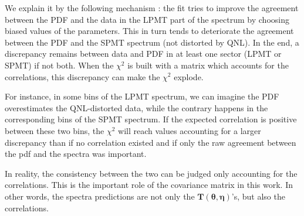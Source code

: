 \documentclass[../main.tex]{subfiles}
\begin{document}
We explain it by the following mechanism : the fit tries to improve the agreement between the PDF and the data in the LPMT part of the spectrum by choosing biased values of the parameters. This in turn tends to deteriorate the agreement between the PDF and the SPMT spectrum (not distorted by QNL). In the end, a discrepancy remains between data and PDF in at least one sector (LPMT or SPMT) if not both. When the $\chi^2$ is built with a matrix which accounts for the correlations, this discrepancy can make the $\chi^2$ explode.

For instance, in some bins of the LPMT spectrum, we can imagine the PDF overestimates the QNL-distorted data, while the contrary happens in the corresponding bins of the SPMT spectrum. If the expected correlation is positive between these two bins, the $\chi^2$ will reach values accounting for a larger discrepancy than if no correlation existed and if only the raw agreement between the pdf and the spectra was important.

In reality, the consistency between the two can be judged only accounting for the correlations. This is the important role of the covariance matrix in this work. In other words, the spectra predictions are not only the $\bm{T}(\bm{\theta},\bm{\eta})$'s, but also the correlations.
\end{document}
